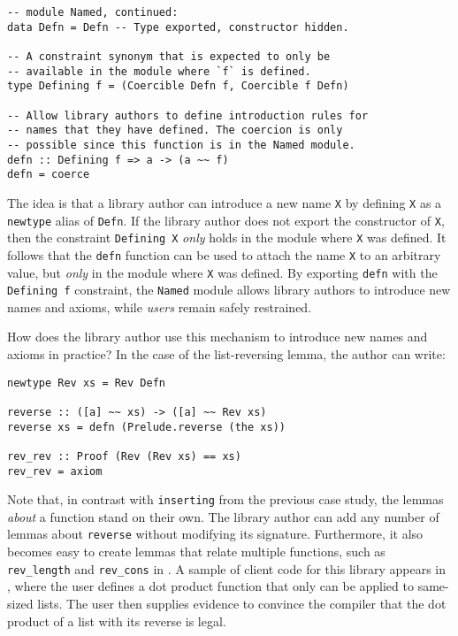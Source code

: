 \documentclass[format=sigplan, review=false, screen=true, 10pt]{acmart}
\begin{document}
\begin{verbatim}
-- module Named, continued:
data Defn = Defn -- Type exported, constructor hidden.

-- A constraint synonym that is expected to only be
-- available in the module where `f` is defined.
type Defining f = (Coercible Defn f, Coercible f Defn)

-- Allow library authors to define introduction rules for
-- names that they have defined. The coercion is only
-- possible since this function is in the Named module.
defn :: Defining f => a -> (a ~~ f)
defn = coerce
\end{verbatim}

The idea is that a library author can introduce a new name \texttt{X} by
defining \texttt{X} as a \texttt{newtype} alias of \texttt{Defn}. If the library author does not
export the constructor of \texttt{X}, then the constraint \texttt{Defining X} \emph{only}
holds in the module where \texttt{X} was defined. It follows that the \texttt{defn} function
can be used to attach the name \texttt{X} to an arbitrary value, but \emph{only} in the
module where \texttt{X} was defined. By exporting \texttt{defn} with the \texttt{Defining f}
constraint, the \texttt{Named} module allows library authors to introduce new names and axioms,
while \emph{users} remain safely restrained.

How does the library author use this mechanism to introduce new names and axioms in practice?
In the case of the list-reversing lemma, the author can write:
\begin{verbatim}
newtype Rev xs = Rev Defn

reverse :: ([a] ~~ xs) -> ([a] ~~ Rev xs)
reverse xs = defn (Prelude.reverse (the xs))

rev_rev :: Proof (Rev (Rev xs) == xs)
rev_rev = axiom
\end{verbatim}
Note that, in contrast with \texttt{inserting} from the previous case study,
the lemmas \emph{about} a function stand on their own.
The library author can add any number of lemmas about \texttt{reverse}
without modifying its signature. Furthermore, it also becomes easy to
create lemmas that relate multiple functions, such as \verb|rev_length|
and \verb|rev_cons| in . A sample of client code for this
library appears in , where the user defines a dot product function that only can be applied to same-sized lists.
The user then supplies evidence to convince the compiler that the dot product of a list with its reverse is legal.
\end{document}
